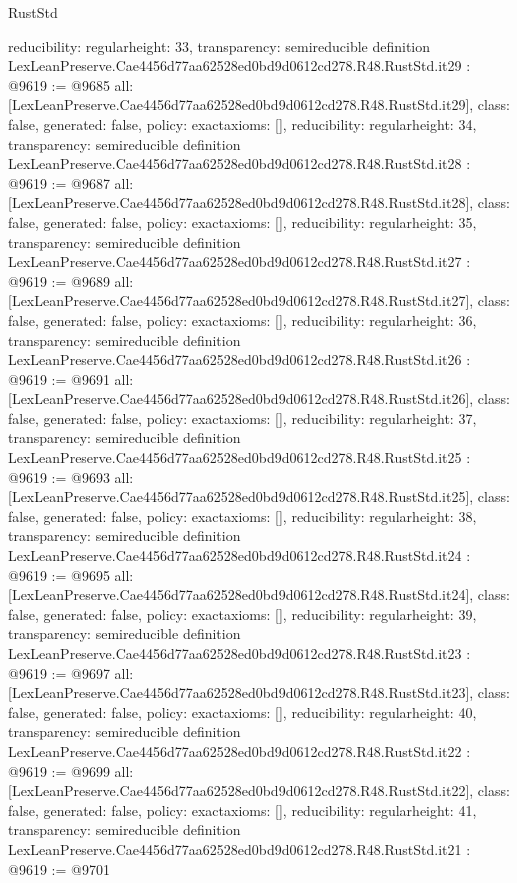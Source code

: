 \begin{lexlean}{RustStd}
\begin{coremodule}
{  reducibility: regular{height: 33},
  transparency: semireducible
}
definition LexLeanPreserve.Cae4456d77aa62528ed0bd9d0612cd278.R48.RustStd.it29 : @9619 := @9685 {
  all: [LexLeanPreserve.Cae4456d77aa62528ed0bd9d0612cd278.R48.RustStd.it29],
  class: false,
  generated: false,
  policy: exact{axioms: []},
  reducibility: regular{height: 34},
  transparency: semireducible
}
definition LexLeanPreserve.Cae4456d77aa62528ed0bd9d0612cd278.R48.RustStd.it28 : @9619 := @9687 {
  all: [LexLeanPreserve.Cae4456d77aa62528ed0bd9d0612cd278.R48.RustStd.it28],
  class: false,
  generated: false,
  policy: exact{axioms: []},
  reducibility: regular{height: 35},
  transparency: semireducible
}
definition LexLeanPreserve.Cae4456d77aa62528ed0bd9d0612cd278.R48.RustStd.it27 : @9619 := @9689 {
  all: [LexLeanPreserve.Cae4456d77aa62528ed0bd9d0612cd278.R48.RustStd.it27],
  class: false,
  generated: false,
  policy: exact{axioms: []},
  reducibility: regular{height: 36},
  transparency: semireducible
}
definition LexLeanPreserve.Cae4456d77aa62528ed0bd9d0612cd278.R48.RustStd.it26 : @9619 := @9691 {
  all: [LexLeanPreserve.Cae4456d77aa62528ed0bd9d0612cd278.R48.RustStd.it26],
  class: false,
  generated: false,
  policy: exact{axioms: []},
  reducibility: regular{height: 37},
  transparency: semireducible
}
definition LexLeanPreserve.Cae4456d77aa62528ed0bd9d0612cd278.R48.RustStd.it25 : @9619 := @9693 {
  all: [LexLeanPreserve.Cae4456d77aa62528ed0bd9d0612cd278.R48.RustStd.it25],
  class: false,
  generated: false,
  policy: exact{axioms: []},
  reducibility: regular{height: 38},
  transparency: semireducible
}
definition LexLeanPreserve.Cae4456d77aa62528ed0bd9d0612cd278.R48.RustStd.it24 : @9619 := @9695 {
  all: [LexLeanPreserve.Cae4456d77aa62528ed0bd9d0612cd278.R48.RustStd.it24],
  class: false,
  generated: false,
  policy: exact{axioms: []},
  reducibility: regular{height: 39},
  transparency: semireducible
}
definition LexLeanPreserve.Cae4456d77aa62528ed0bd9d0612cd278.R48.RustStd.it23 : @9619 := @9697 {
  all: [LexLeanPreserve.Cae4456d77aa62528ed0bd9d0612cd278.R48.RustStd.it23],
  class: false,
  generated: false,
  policy: exact{axioms: []},
  reducibility: regular{height: 40},
  transparency: semireducible
}
definition LexLeanPreserve.Cae4456d77aa62528ed0bd9d0612cd278.R48.RustStd.it22 : @9619 := @9699 {
  all: [LexLeanPreserve.Cae4456d77aa62528ed0bd9d0612cd278.R48.RustStd.it22],
  class: false,
  generated: false,
  policy: exact{axioms: []},
  reducibility: regular{height: 41},
  transparency: semireducible
}
definition LexLeanPreserve.Cae4456d77aa62528ed0bd9d0612cd278.R48.RustStd.it21 : @9619 := @9701 {
}
\end{coremodule}
\end{lexlean}
